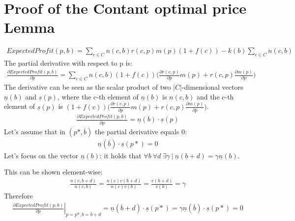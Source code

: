\documentclass[11pt]{article} %
\begin{document}
\section{Proof of the Contant optimal price Lemma}\label{sec.ConstOptPrice}
\begin{align*}
ExpectedProfit(p,b)=\sum_{c \in C}{n(c,b)r(c,p)m(p)(1+f(c))}-k(b)\sum_{c \in C}{n(c,b)}
\end{align*}
The partial derivative with respect to p is:
\begin{align*}
\frac{\partial ExpectedProfit(p,b)}{\partial p}=\sum_{c \in C}{n(c,b)(1+f(c))\bigg(\frac{\partial r(c,p)}{\partial p}m(p) + r(c,p)\frac{\partial m(p)}{\partial p}\bigg)}
\end{align*}
The derivative can be seen as the scalar product of two $|C|$-dimensional vectors $\underline n(b)$ and $\underline s(p)$, where the c-th element of $\underline n(b)$ is $n(c,b)$ and the c-th element of $\underline s(p)$ is $(1+f(c))\bigg(\frac{\partial r(c,p)}{\partial p}m(p) + r(c,p)\frac{\partial m(p)}{\partial p}\bigg)$.
\begin{align*}
\frac{\partial ExpectedProfit(p,b)}{\partial p}=\underline n(b)\cdot \underline s(p)
\end{align*}
Let's assume that in $(p*, \overline b)$ the partial derivative equals 0:
\begin{align*}
\underline n(\overline b)\cdot \underline s(p*) = 0
\end{align*}
Let's focus on the vector $\underline n(b)$: it holds that $\forall b \ \forall d \ \exists \gamma \  | \ \underline n(b + d)=\gamma\underline n(b)$.

This can be shown element-wise:
\begin{align*}
\frac{n(c, b+d)}{n(c,b)} = \frac{n(c)v(b+d)}{n(c)v(b)} = \frac{v(b+d)}{v(b)} = \gamma
\end{align*}
Therefore
\begin{align*}
\left.\frac{\partial ExpectedProfit(p,b)}{\partial p}\right\rvert_{p=p*, b=\overline b+d}=\underline n(\overline b+d)\cdot \underline s(p*) = \gamma \underline n(\overline b)\cdot \underline s(p*) = 0
\end{align*}
\end{document}
